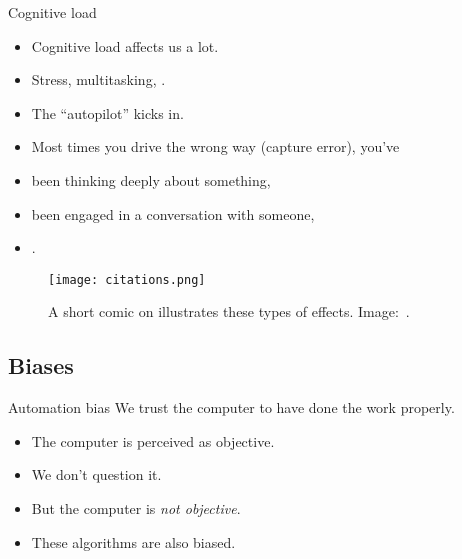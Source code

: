 \begin{frame}
  \begin{block}{Cognitive load}
    \begin{itemize}
      \item Cognitive load affects us a lot.
      \item Stress, multitasking, \etc.
      \item The \enquote{autopilot} kicks in.
    \end{itemize}
  \end{block}
  
  \pause

  \begin{example}
    \begin{itemize}
      \item Most times you drive the wrong way (capture error), you've
      \item been thinking deeply about something,
      \item been engaged in a conversation with someone,
      \item \etc.
    \end{itemize}
  \end{example}
\end{frame}

\begin{frame}
  \begin{figure}
    \texttt{[image: citations.png]}
    \caption{A short comic on illustrates these types of effects.
      Image:~\cite{xkcd906}.}
  \end{figure}
\end{frame}

\subsection{Biases}

\begin{frame}
  \begin{block}{Automation bias}
    We trust the computer to have done the work properly.
  \end{block}

  \begin{remark}
    \begin{itemize}
      \item The computer is perceived as objective.
      \item We don't question it.
      \item But the computer is \emph{not objective}.
      \item These algorithms are also biased.
    \end{itemize}
  \end{remark}
\end{frame}

